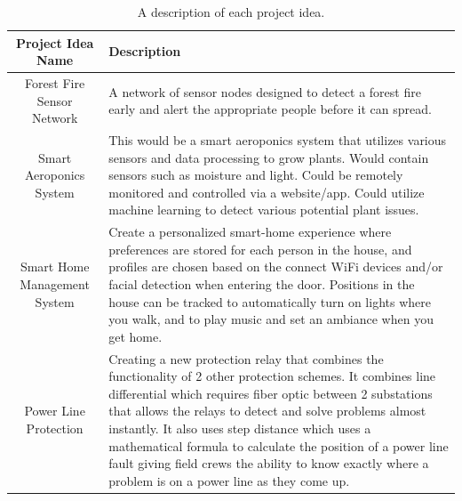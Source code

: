 \documentclass[titlepage, 11pt, letterpaper]{article}
\begin{document}
\begin{table}[H]
    \centering
    \begin{tabularx}{\linewidth}{|c|X|}
        \hline
        Project Idea Name & Description \\
        \hline
        Forest Fire Sensor Network &
        A network of sensor nodes designed to detect a forest fire early and alert the appropriate people before it can spread. \\\hline
        
        Smart Aeroponics System &
        This would be a smart aeroponics system that utilizes various sensors and data processing to grow plants. Would contain sensors such as moisture and light. Could be remotely monitored and controlled via a website/app. Could utilize machine learning to detect various potential plant issues. \\\hline
        
        Smart Home Management System 
        & Create a personalized smart-home experience where preferences are stored for each person in the house, and profiles are chosen based on the connect WiFi devices and/or facial detection when entering the door. Positions in the house can be tracked to automatically turn on lights where you walk, and to play music and set an ambiance when you get home.
        \\
        
        \hline
        Power Line Protection &
        Creating a new protection relay that combines the functionality of 2 other protection schemes. It combines line differential which requires fiber optic between 2 substations that allows the relays to detect and solve problems almost instantly. It also uses step distance which uses a mathematical formula to calculate the position of a power line fault giving field crews the ability to know exactly where a problem is on a power line as they come up. \\\hline
    
    \end{tabularx}
    \caption{A description of each project idea.}
\end{table}
\end{document}
